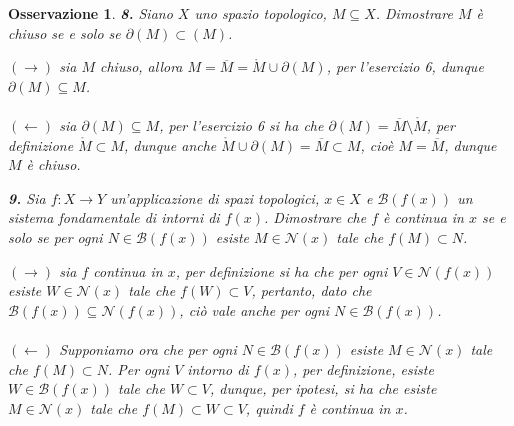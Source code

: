 \documentclass[oneside, 11pt]{amsbook}
\makeatletter
\newcommand{\0}{{(0)}}
\newcommand{\3}{{(3)}}
\theoremstyle{colonplain}
\theoremstyle{colondefinition}
\theoremstyle{colonremark}
\newtheorem{rmk}[thm]{Osservazione}
\numberwithin{equation}{chapter}
\renewcommand{\proofname}{Dimostrazione}
\renewenvironment{proof}[1][\proofname]{\par
  \pushQED{\end{proof}}%
  \normalfont \topsep6\p@\@plus6\p@\relax
  \trivlist
  \item[\hskip\labelsep\bfseries #1:]\ignorespaces
}{%
  \popQED\endtrivlist\@endpefalse
}
\makeatother
\begin{document}
\begin{rmk}
\textbf{8.} Siano $X$ uno spazio topologico, $M \subseteq X$. Dimostrare $M$ è chiuso se e solo se $\partial(M) \subset (M)$.
\begin{proof}
$(\rightarrow)$ sia $M$ chiuso, allora $M = \overline{M} = \mathring{M} \cup \partial(M)$, per l'\textit{esercizio 6}, dunque $\partial(M) \subseteq M$. \\ \\
$(\leftarrow)$ sia $\partial(M) \subseteq M$, per l'\textit{esercizio 6} si ha che $\partial(M) = \overline{M} \setminus \mathring{M}$, per definizione $\mathring{M} \subset M$, dunque anche $\mathring{M} \cup \partial(M) = \overline{M} \subset M$, cioè $M = \overline{M}$, dunque $M$ è chiuso.
\end{proof}

\textbf{9.} Sia $f : X \longrightarrow Y$ un'applicazione di spazi topologici, $x \in X$ e $\mathcal{B}(f(x))$ un sistema fondamentale di intorni di $f(x)$. Dimostrare che $f$ è continua in $x$ se e solo se per ogni $N \in \mathcal{B}(f(x))$ esiste $M \in \mathcal{N}(x)$ tale che $f(M) \subset N$.
\begin{proof} $(\rightarrow)$ sia $f$ continua in $x$, per definizione si ha che per ogni $V \in \mathcal{N}(f(x))$ esiste $W \in \mathcal{N}(x)$ tale che $f(W) \subset V$, pertanto, dato che $\mathcal{B}(f(x)) \subseteq \mathcal{N}(f(x))$, ciò vale anche per ogni $N \in \mathcal{B}(f(x))$. \\ \\
$(\leftarrow)$ Supponiamo ora che per ogni $N \in \mathcal{B}(f(x))$ esiste $M \in \mathcal{N}(x)$ tale che $f(M) \subset N$. Per ogni $V$ intorno di $f(x)$, per definizione, esiste $W \in \mathcal{B}(f(x))$ tale che $W \subset V$, dunque, per ipotesi, si ha che esiste $M \in \mathcal{N}(x)$ tale che $f(M) \subset W \subset V$, quindi $f$ è continua in $x$.
\end{proof}

\newpage

\end{rmk}
\end{document}
